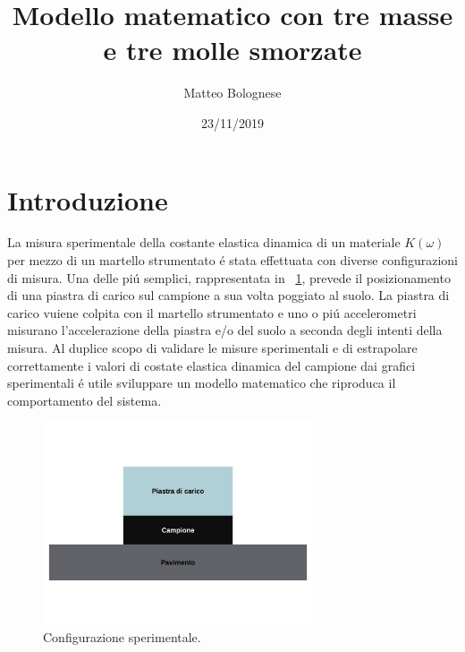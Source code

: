 \documentclass[12pt,a4paper]{article}
\begin{document}
 	\title{Modello matematico con tre masse e tre molle smorzate} \author{Matteo Bolognese}
 	\date{23/11/2019}
 	\maketitle
 	
 \section{Introduzione}
	La misura sperimentale della costante elastica dinamica di un materiale $K(\omega)$ per mezzo di un martello strumentato \'e stata effettuata con diverse configurazioni di misura. Una delle pi\'u semplici, rappresentata in \figurename~\ref{fig:Phisical-configuration}, prevede il posizionamento di una piastra di carico sul campione a sua volta poggiato al suolo. La piastra di carico vuiene colpita con il martello strumentato e uno o pi\'u accelerometri misurano l'accelerazione della piastra e/o del suolo a seconda degli intenti della misura.
	Al duplice scopo di validare le misure sperimentali e di estrapolare correttamente i valori di costate elastica dinamica del campione dai grafici sperimentali \'e utile sviluppare un modello matematico che riproduca il comportamento del sistema.
	
	\begin{figure}
		\centering
		\includegraphics[width=8cm]{Phisical-system}
		\caption{Configurazione sperimentale.}
		\label{fig:Phisical-configuration}
	\end{figure}
 	
\end{document}
